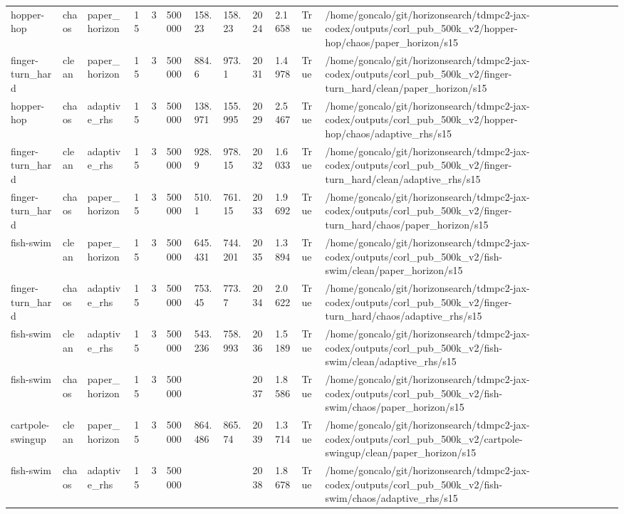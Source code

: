 \begin{tabular}{llllllllllll}
hopper-hop & chaos & paper\_horizon & 15 & 3 & 500000 & 158.23 & 158.23 & 2024 & 2.1658 & True & /home/goncalo/git/horizonsearch/tdmpc2-jax-codex/outputs/corl\_pub\_500k\_v2/hopper-hop/chaos/paper\_horizon/s15 \\
finger-turn\_hard & clean & paper\_horizon & 15 & 3 & 500000 & 884.6 & 973.1 & 2031 & 1.4978 & True & /home/goncalo/git/horizonsearch/tdmpc2-jax-codex/outputs/corl\_pub\_500k\_v2/finger-turn\_hard/clean/paper\_horizon/s15 \\
hopper-hop & chaos & adaptive\_rhs & 15 & 3 & 500000 & 138.971 & 155.995 & 2029 & 2.5467 & True & /home/goncalo/git/horizonsearch/tdmpc2-jax-codex/outputs/corl\_pub\_500k\_v2/hopper-hop/chaos/adaptive\_rhs/s15 \\
finger-turn\_hard & clean & adaptive\_rhs & 15 & 3 & 500000 & 928.9 & 978.15 & 2032 & 1.6033 & True & /home/goncalo/git/horizonsearch/tdmpc2-jax-codex/outputs/corl\_pub\_500k\_v2/finger-turn\_hard/clean/adaptive\_rhs/s15 \\
finger-turn\_hard & chaos & paper\_horizon & 15 & 3 & 500000 & 510.1 & 761.15 & 2033 & 1.9692 & True & /home/goncalo/git/horizonsearch/tdmpc2-jax-codex/outputs/corl\_pub\_500k\_v2/finger-turn\_hard/chaos/paper\_horizon/s15 \\
fish-swim & clean & paper\_horizon & 15 & 3 & 500000 & 645.431 & 744.201 & 2035 & 1.3894 & True & /home/goncalo/git/horizonsearch/tdmpc2-jax-codex/outputs/corl\_pub\_500k\_v2/fish-swim/clean/paper\_horizon/s15 \\
finger-turn\_hard & chaos & adaptive\_rhs & 15 & 3 & 500000 & 753.45 & 773.7 & 2034 & 2.0622 & True & /home/goncalo/git/horizonsearch/tdmpc2-jax-codex/outputs/corl\_pub\_500k\_v2/finger-turn\_hard/chaos/adaptive\_rhs/s15 \\
fish-swim & clean & adaptive\_rhs & 15 & 3 & 500000 & 543.236 & 758.993 & 2036 & 1.5189 & True & /home/goncalo/git/horizonsearch/tdmpc2-jax-codex/outputs/corl\_pub\_500k\_v2/fish-swim/clean/adaptive\_rhs/s15 \\
fish-swim & chaos & paper\_horizon & 15 & 3 & 500000 &  &  & 2037 & 1.8586 & True & /home/goncalo/git/horizonsearch/tdmpc2-jax-codex/outputs/corl\_pub\_500k\_v2/fish-swim/chaos/paper\_horizon/s15 \\
cartpole-swingup & clean & paper\_horizon & 15 & 3 & 500000 & 864.486 & 865.74 & 2039 & 1.3714 & True & /home/goncalo/git/horizonsearch/tdmpc2-jax-codex/outputs/corl\_pub\_500k\_v2/cartpole-swingup/clean/paper\_horizon/s15 \\
fish-swim & chaos & adaptive\_rhs & 15 & 3 & 500000 &  &  & 2038 & 1.8678 & True & /home/goncalo/git/horizonsearch/tdmpc2-jax-codex/outputs/corl\_pub\_500k\_v2/fish-swim/chaos/adaptive\_rhs/s15 \\

\end{tabular}
